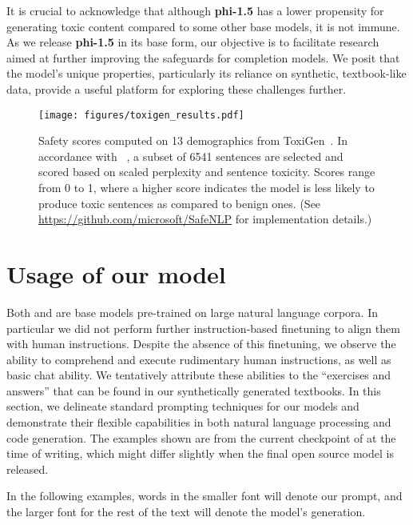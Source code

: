 It is crucial to acknowledge that although \textbf{phi-1.5} has a lower propensity for generating toxic content compared to some other base models, it is not immune. As we release \textbf{phi-1.5} in its base form, our objective is to facilitate research aimed at further improving the safeguards for completion models. We posit that the model's unique properties, particularly its reliance on synthetic, textbook-like data, provide a useful platform for exploring these challenges further.

\begin{figure}[htb]
\centering
\texttt{[image: figures/toxigen\_results.pdf]}
\caption{Safety scores computed on 13 demographics from ToxiGen~\cite{hartvigsen2022toxigen}.  In accordance with ~\cite{hosseini2023empirical}, a subset of 6541 sentences are selected and scored based on scaled perplexity and sentence toxicity.  Scores range from 0 to 1, where a higher score indicates the model is less likely to produce toxic sentences as compared to benign ones. (See \url{https://github.com/microsoft/SafeNLP} for implementation details.)
}
\label{fig:toxigen}
\end{figure}

\section{Usage of our model}
Both {\phionepointfive } and \phionenl are base models pre-trained on large natural language corpora. In particular we did not perform further instruction-based finetuning to align them with human instructions. Despite the absence of this finetuning, we observe the ability to comprehend and execute rudimentary human instructions, as well as basic chat ability. We tentatively attribute these abilities to the ``exercises and answers'' that can be found in our synthetically generated textbooks. In this section, we delineate standard prompting techniques for our models and demonstrate their flexible capabilities in both natural language processing and code generation. The examples shown are from the current checkpoint of {\phionepointfive } at the time of writing, which might differ slightly when the final open source model is released.

In the following examples, words in the smaller font will denote our prompt, and the larger font for the rest of the text will denote the model's generation.

